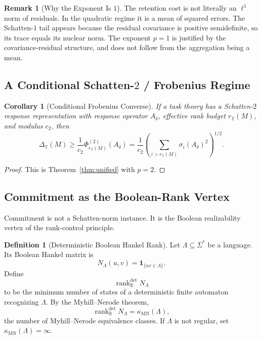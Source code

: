 \documentclass[12pt]{article}
\newtheorem{corollary}[theorem]{Corollary}
\theoremstyle{definition}
\newtheorem{definition}[theorem]{Definition}
\newtheorem{remark}[theorem]{Remark}
\newcommand{\rankBdet}{\operatorname{rank}_{\mathbb B}^{\mathrm{det}}}
\newcommand{\kappaMN}{\kappa_{\mathrm{MN}}}
\begin{document}
\begin{remark}[Why the Exponent Is $1$]
\label{rem:retention-why-p1}
The retention cost is not literally an $\ell^1$ norm of residuals.  In the
quadratic regime it is a mean of squared errors.  The Schatten-$1$ tail appears
because the residual covariance is positive semidefinite, so its trace equals
its nuclear norm.  The exponent $p=1$ is justified by the covariance-residual
structure, and does not follow from the aggregation being a mean.
\end{remark}

\subsection{A Conditional Schatten-$2$ / Frobenius Regime}
\label{subsec:schatten-frobenius}

\begin{corollary}[Conditional Frobenius Converse]
\label{cor:l2}
If a task theory has a Schatten-$2$ response representation with response
operator $A_\delta$, effective rank budget $r_{\mathbb T}(M)$, and modulus
$c_2$, then
\[
\Delta_{\mathbb T}(M)
\ge
\frac1{c_2}
\Phi^{(2)}_{r_{\mathbb T}(M)}(A_\delta)
=
\frac1{c_2}
\left(
\sum_{i>r_{\mathbb T}(M)}
\sigma_i(A_\delta)^2
\right)^{1/2}.
\]
\end{corollary}

\begin{proof}
This is Theorem~\ref{thm:unified} with $p=2$.
\end{proof}

\subsection{Commitment as the Boolean-Rank Vertex}
\label{subsec:schatten-commitment}

Commitment is not a Schatten-norm instance.  It is the Boolean realizability
vertex of the rank-control principle.

\begin{definition}[Deterministic Boolean Hankel Rank]
\label{def:boolean-hankel-rank}
Let $\Lambda\subseteq\Sigma^*$ be a language.  Its Boolean Hankel matrix is
\[
N_\Lambda(u,v)
=
\mathbf 1_{\{uv\in\Lambda\}}.
\]
Define
\[
\rankBdet N_\Lambda
\]
to be the minimum number of states of a deterministic finite automaton
recognizing $\Lambda$.  By the Myhill--Nerode theorem,
\[
\rankBdet N_\Lambda
=
\kappaMN(\Lambda),
\]
the number of Myhill--Nerode equivalence classes.  If $\Lambda$ is not
regular, set $\kappaMN(\Lambda)=\infty$.
\end{definition}
\end{document}
